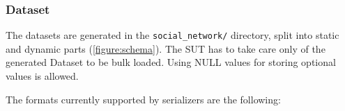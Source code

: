 








\subsubsection{Dataset}

The datasets are generated in the \texttt{social\_network/} directory, split into static and dynamic parts (\autoref{figure:schema}).
The SUT has to take care only of the generated Dataset to be bulk loaded. Using NULL values for storing optional values is allowed.

The formats currently supported by \datagen serializers are the following:

